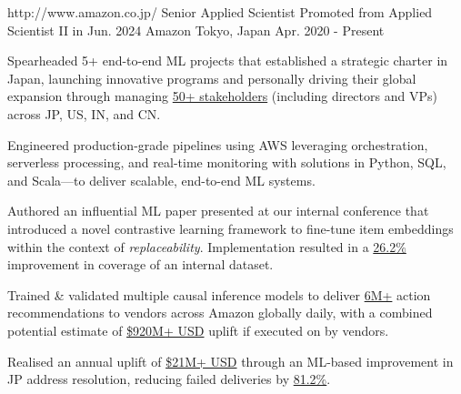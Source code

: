 

\begin{cventries}

  \cventry
    {http://www.amazon.co.jp/}
    {Senior Applied Scientist} %
    {Promoted from Applied Scientist II in Jun. 2024}
    {Amazon} %
    {Tokyo, Japan} %
    {Apr. 2020 - Present} %
    {
      \begin{cvitems} %
        \item {Spearheaded 5+ end-to-end ML projects that established a strategic charter in Japan, launching innovative programs and personally driving their global expansion through managing \underline{50+ stakeholders} (including directors and VPs) across JP, US, IN, and CN.}
        \item {Engineered production-grade pipelines using AWS leveraging orchestration, serverless processing, and real-time monitoring with solutions in Python, SQL, and Scala—to deliver scalable, end-to-end ML systems.}
        \item {Authored an influential ML paper presented at our internal conference that introduced a novel contrastive learning framework to fine-tune item embeddings within the context of \textit{replaceability}. Implementation resulted in a \underline{26.2\%} improvement in coverage of an internal dataset.}
        \item {Trained \& validated multiple causal inference models to deliver \underline{6M+} action recommendations to vendors across Amazon globally daily, with a combined potential estimate of \underline{\$920M+ USD} uplift if executed on by vendors.}
        \item {Realised an annual uplift of \underline{\$21M+ USD} through an ML-based improvement in JP address resolution, reducing failed deliveries by \underline{81.2\%}.}
      \end{cvitems}
    }



\end{cventries}
